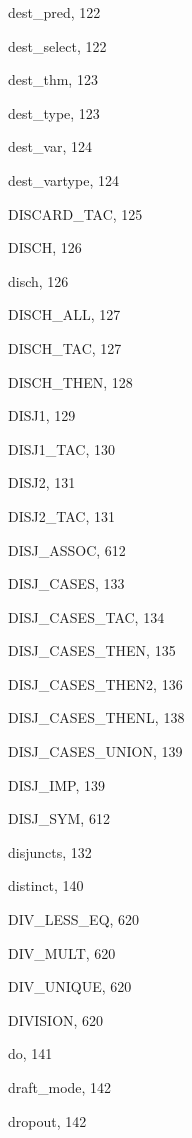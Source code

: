 \begin{theindex}
  \item {\ptt dest\_pred}, 122
  \item {\ptt dest\_select}, 122
  \item {\ptt dest\_thm}, 123
  \item {\ptt dest\_type}, 123
  \item {\ptt dest\_var}, 124
  \item {\ptt dest\_vartype}, 124
  \item {\ptt DISCARD\_TAC}, 125
  \item {\ptt DISCH}, 126
  \item {\ptt disch}, 126
  \item {\ptt DISCH\_ALL}, 127
  \item {\ptt DISCH\_TAC}, 127
  \item {\ptt DISCH\_THEN}, 128
  \item {\ptt DISJ1}, 129
  \item {\ptt DISJ1\_TAC}, 130
  \item {\ptt DISJ2}, 131
  \item {\ptt DISJ2\_TAC}, 131
  \item {\ptt DISJ\_ASSOC}, 612
  \item {\ptt DISJ\_CASES}, 133
  \item {\ptt DISJ\_CASES\_TAC}, 134
  \item {\ptt DISJ\_CASES\_THEN}, 135
  \item {\ptt DISJ\_CASES\_THEN2}, 136
  \item {\ptt DISJ\_CASES\_THENL}, 138
  \item {\ptt DISJ\_CASES\_UNION}, 139
  \item {\ptt DISJ\_IMP}, 139
  \item {\ptt DISJ\_SYM}, 612
  \item {\ptt disjuncts}, 132
  \item {\ptt distinct}, 140
  \item {\ptt DIV\_LESS\_EQ}, 620
  \item {\ptt DIV\_MULT}, 620
  \item {\ptt DIV\_UNIQUE}, 620
  \item {\ptt DIVISION}, 620
  \item {\ptt do}, 141
  \item {\ptt draft\_mode}, 142
  \item {\ptt dropout}, 142

  \indexspace


\end{theindex}
